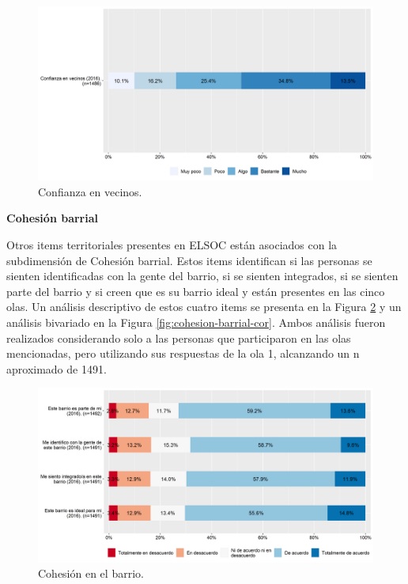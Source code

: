 \documentclass[
  12pt,
]{book}
\begin{document}
\begin{figure}[H]

{\centering \includegraphics[width=1\linewidth,height=1\textheight]{output/graphs/confianza-vecinos} 

}

\caption{Confianza en vecinos.}\label{fig:confianza-vecinos}
\end{figure}

\textbf{Cohesión barrial}

Otros items territoriales presentes en ELSOC están asociados con la subdimensión de Cohesión barrial. Estos items identifican si las personas se sienten identificadas con la gente del barrio, si se sienten integrados, si se sienten parte del barrio y si creen que es su barrio ideal y están presentes en las cinco olas. Un análisis descriptivo de estos cuatro items se presenta en la Figura \ref{fig:cohesion-barrial} y un análisis bivariado en la Figura \ref{fig:cohesion-barrial-cor}. Ambos análisis fueron realizados considerando solo a las personas que participaron en las olas mencionadas, pero utilizando sus respuestas de la ola 1, alcanzando un n aproximado de 1491.

\begin{figure}[H]

{\centering \includegraphics[width=1\linewidth,height=1\textheight]{output/graphs/cohesion-barrial} 

}

\caption{Cohesión en el barrio.}\label{fig:cohesion-barrial}
\end{figure}
\end{document}
